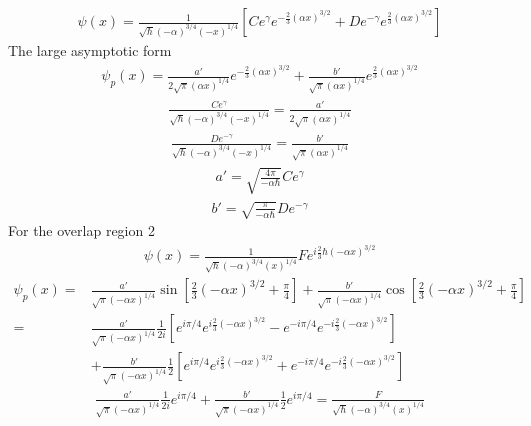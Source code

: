 \begin{align*}
    \psi(x)=\frac{1}{\sqrt{\hbar}(-\alpha)^{3/4}(-x)^{1/4}}
    \left[
    Ce^\gamma
    e^{-\frac{2}{3}(\alpha x)^{3/2}}
    +
    De^{-\gamma}
    e^{\frac{2}{3}(\alpha x)^{3/2}}
    \right]
\end{align*}
The large asymptotic form
\begin{align*}
    \psi_p(x)
    =\frac{a'}{2\sqrt{\pi}(\alpha x)^{1/4}}
    e^{-\frac{2}{3}(\alpha x)^{3/2}}
    +
    \frac{b'}{\sqrt{\pi}(\alpha x)^{1/4}}
    e^{\frac{2}{3}(\alpha x)^{3/2}}
\end{align*}
\begin{align*}
    \frac{Ce^\gamma}{\sqrt{\hbar}(-\alpha)^{3/4}(-x)^{1/4}}    
    =\frac{a'}{2\sqrt{\pi}(\alpha x)^{1/4}}
\end{align*}
\begin{align*}
    \frac{De^{-\gamma}}{\sqrt{\hbar}(-\alpha)^{3/4}(-x)^{1/4}}
    =\frac{b'}{\sqrt{\pi}(\alpha x)^{1/4}}
\end{align*}
\begin{align*}
    a'=
    \sqrt{\frac{4 \pi}{-\alpha\hbar}}
    Ce^\gamma
\end{align*}
\begin{align*}
    b'=
    \sqrt{\frac{\pi}{-\alpha \hbar}}
    De^{-\gamma}
\end{align*}
For the overlap region 2
\begin{align*}
    \psi(x)=
    \frac{1}{\sqrt{\hbar}(-\alpha)^{3/4}(x)^{1/4}}
    Fe^{i\frac{2}{3}\hbar(-\alpha x)^{3/2}}
\end{align*}
\begin{align*}
    \psi_p(x)=&
    \frac{a'}{\sqrt{\pi}(-\alpha x)^{1/4}}\sin\left[
    \frac{2}{3}(-\alpha x)^{3/2}+\frac{\pi}{4}
    \right]
    +
    \frac{b'}{\sqrt{\pi}(-\alpha x)^{1/4}}\cos\left[
    \frac{2}{3}(-\alpha x)^{3/2}+\frac{\pi}{4}
    \right]\\
    =&
    \frac{a'}{\sqrt{\pi}(-\alpha x)^{1/4}}
    \frac{1}{2i}[
    e^{i\pi/4}e^{i\frac{2}{3}(-\alpha x)^{3/2}}
    -
    e^{-i\pi/4}e^{-i\frac{2}{3}(-\alpha x)^{3/2}}
    ]\\
    &+
    \frac{b'}{\sqrt{\pi}(-\alpha x)^{1/4}}
    \frac{1}{2}[
    e^{i\pi/4}e^{i\frac{2}{3}(-\alpha x)^{3/2}}
    +
    e^{-i\pi/4}e^{-i\frac{2}{3}(-\alpha x)^{3/2}}
    ]
\end{align*}
\begin{align*}
    \frac{a'}{\sqrt{\pi}(-\alpha x)^{1/4}}
    \frac{1}{2i}e^{i\pi /4}
    +
    \frac{b'}{\sqrt{\pi}(-\alpha x)^{1/4}}
    \frac{1}{2}e^{i\pi /4}=
    \frac{F}{\sqrt{\hbar}(-\alpha)^{3/4}(x)^{1/4}}
\end{align*}
